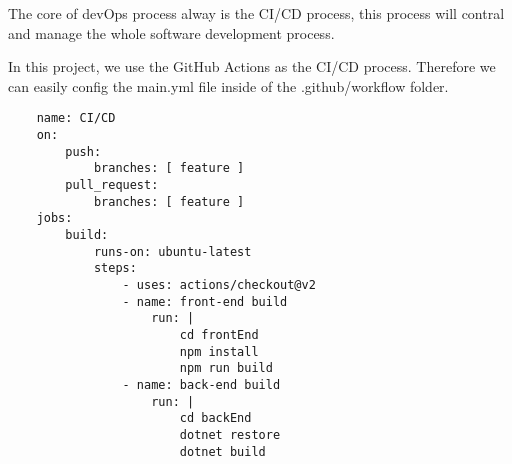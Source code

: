 The core of devOps process alway is the CI/CD process, this process will contral
and manage the whole software development process.

In this project, we use the GitHub Actions as the CI/CD process.
Therefore we can easily config the main.yml file inside of the .github/workflow folder.

\begin{lstlisting}
    name: CI/CD
    on: 
        push:
            branches: [ feature ]
        pull_request:
            branches: [ feature ]
    jobs:
        build:
            runs-on: ubuntu-latest
            steps:
                - uses: actions/checkout@v2
                - name: front-end build
                    run: |
                        cd frontEnd
                        npm install
                        npm run build
                - name: back-end build
                    run: |
                        cd backEnd
                        dotnet restore
                        dotnet build
                        
\end{lstlisting}